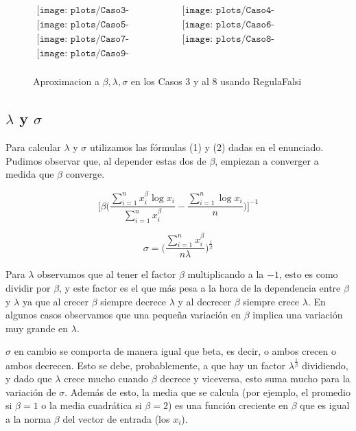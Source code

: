 \begin{figure}
$\begin{array}{cc}
\texttt{[image: plots/Caso3-RegulaFalsi.png]} &
\texttt{[image: plots/Caso4-RegulaFalsi.png]} \\
\texttt{[image: plots/Caso5-RegulaFalsi.png]} &
\texttt{[image: plots/Caso6-RegulaFalsi.png]} \\
\texttt{[image: plots/Caso7-RegulaFalsi.png]} &
\texttt{[image: plots/Caso8-RegulaFalsi.png]} \\
\texttt{[image: plots/Caso9-RegulaFalsi.png]} & \\

\end{array}$

\caption{Aproximacion a $\beta, \lambda, \sigma$ en los Casos 3 y al 8 usando RegulaFalsi}
\label{fig:AproxCasosRegulaFalsi}



\end{figure}


\subsection{$\lambda$ y $\sigma$}

\indent Para calcular $\lambda$ y $\sigma$ utilizamos las f\'ormulas (1) y (2) dadas en el enunciado. Pudimos observar que, al depender estas dos de $\beta$, empiezan a converger a medida que $\beta$ converge.

$$\big[ \beta \big( \frac{\sum_{i=1}^{n}x_i^\beta \log x_i}{ \sum_{i=1}^{n} x_i^\beta} - \frac{\sum_{i=1}^{n} \log x_i}{n} \big)\big]^{-1}$$

$$\sigma = \big( \frac{\sum_{i=1}^{n} x_i^\beta}{n\lambda}\big)^{\frac{1}{\beta}}$$

Para $\lambda$ observamos que al tener el factor $\beta$ multiplicando a la $-1$, esto es como dividir por $\beta$, y este factor es el que m\'as pesa a la hora de la dependencia entre $\beta$ y $\lambda$ ya que al crecer $\beta$ siempre decrece $\lambda$ y al decrecer $\beta$ siempre crece $\lambda$. En algunos casos observamos que una peque\~na variaci\'on en $\beta$ implica una variaci\'on muy grande en $\lambda$.

$\sigma$ en cambio se comporta de manera igual que beta, es decir, o ambos crecen o ambos decrecen. Esto se debe, probablemente, a que hay un factor $\lambda^{\frac{1}{\beta}}$ dividiendo, y dado que $\lambda$ crece mucho cuando $\beta$ decrece y viceversa, esto suma mucho para la variaci\'on de $\sigma$. Adem\'as de esto, la media que se calcula (por ejemplo, el promedio si $\beta = 1$ o la media cuadr\'atica si $\beta = 2$) es una funci\'on creciente en $\beta$ que es igual a la norma $\beta$ del vector de entrada (los $x_i$).
